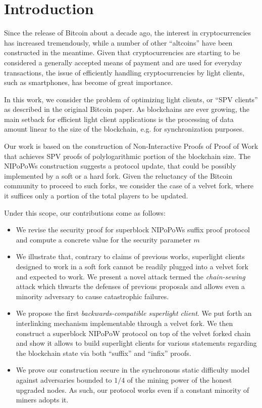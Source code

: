 \section{Introduction}
Since the release of Bitcoin about a decade ago, the interest in cryptocurrencies has increased tremendously, while a number of other ``altcoins'' have been constructed in the meantime. Given that cryptocurrencies are starting to be considered a generally accepted means of payment and are used for everyday transactions, the issue of efficiently handling cryptocurrencies by light clients, such as smartphones, has become of great importance.

In this work, we consider the problem of optimizing light clients, or ``SPV clients'' as described in the original Bitcoin paper\cite{nakamoto}. As blockchains are ever growing, the main setback for efficient light client applications is the processing of data amount linear to the size of the blockchain, e.g. for synchronization purposes. 

Our work is based on the construction of Non-Interactive Proofs of Proof of Work\cite{nipopows} that achieves SPV proofs of polylogarithmic portion of the blockchain size. The NIPoPoWs construction suggests a protocol update, that could be possibly implemented by a soft or a hard fork. Given the reluctancy of the  Bitcoin community to proceed to such forks, we consider the case of a velvet fork\cite{nipopows}\cite{velvet}, where it suffices only a portion of the total players to be updated.

Under this scope, our contributions come as follows:
\begin{itemize}
	\item We revise the security proof for superblock NIPoPoWs suffix proof protocol and compute a concrete value for the security parameter $m$
  	\item We illustrate that, contrary to claims of previous works, superlight clients designed to work in a soft fork cannot be readily plugged into a velvet fork and expected to work. We present a novel attack termed the \emph{chain-sewing} attack which thwarts the defenses of previous proposals and allows even a minority adversary to cause catastrophic failures.
	\item We propose the first \emph{backwards-compatible superlight client}. We put forth an interlinking mechanism implementable through a velvet fork. We then construct a superblock NIPoPoW protocol on top of the velvet forked chain and show it allows to build superlight clients for various statements regarding the blockchain state via both ``suffix'' and ``infix'' proofs. 
	\item We prove our construction secure in the synchronous static difficulty model against adversaries bounded to $1/4$ of the mining power of the honest upgraded nodes. As such, our protocol works even if a constant minority of miners adopts it.
\end{itemize}
